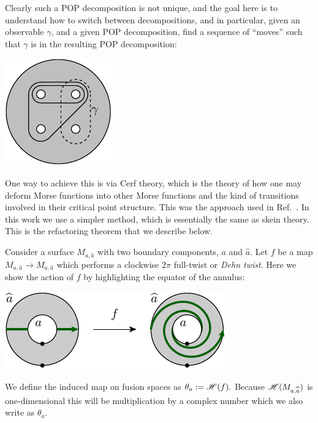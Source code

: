 Clearly such a POP decomposition is not unique,
and the goal here is to understand how to switch between decompositions,
and in particular, given an observable $\gamma$,
and a given POP decomposition, find a sequence
of ``moves'' such that $\gamma$ is in the resulting POP
decomposition:
\begin{center}
\includegraphics[]{pic-refactor.pdf}
\end{center}

One way to achieve this is via Cerf theory, which is the theory
of how one may deform Morse functions into other Morse functions
and the kind of transitions involved in their critical point structure.
This was the approach used in Ref.~\cite{Freedman2002simulation}.
In this work we use a simpler method,
which is essentially the same as {skein theory.}
This is the {refactoring theorem} that we describe below.

Consider a surface $M_{a,\widehat{a}}$
with two boundary components, $a$ and $\widehat{a}.$
Let $f$ be a map $M_{a,\widehat{a}}\to M_{a,\widehat{a}}$
which performs a clockwise $2\pi$ full-twist or \emph{Dehn twist}.
Here we show the action of $f$ by highlighting the
equator of the annulus:
\begin{center}
\includegraphics[]{pic-dehn-twist.pdf}
\end{center}
We define the 
induced map on fusion spaces as $\theta_a := \mathscr{H}(f).$
Because $\mathscr{H}(M_{a,\widehat{a}})$ is one-dimensional
this will be multiplication by a complex number which we also
write as $\theta_a.$

